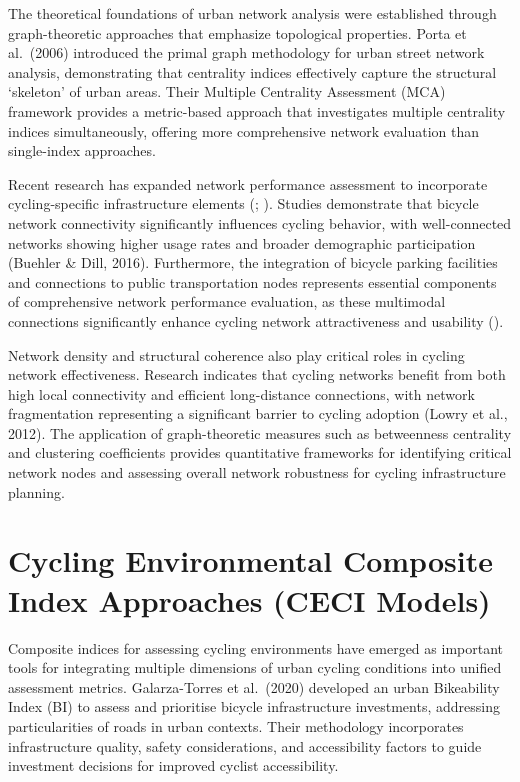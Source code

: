 \documentclass[
  12pt,
  oneside]{book}
\begin{document}
The theoretical foundations of urban network analysis were established through graph-theoretic approaches that emphasize topological properties. Porta et al.~(2006) introduced the primal graph methodology for urban street network analysis, demonstrating that centrality indices effectively capture the structural `skeleton' of urban areas. Their Multiple Centrality Assessment (MCA) framework provides a metric-based approach that investigates multiple centrality indices simultaneously, offering more comprehensive network evaluation than single-index approaches.

Recent research has expanded network performance assessment to incorporate cycling-specific infrastructure elements (\textcite{lovelace_propensity_2017}; \textcite{netjasov_potential_2019}). Studies demonstrate that bicycle network connectivity significantly influences cycling behavior, with well-connected networks showing higher usage rates and broader demographic participation (Buehler \& Dill, 2016). Furthermore, the integration of bicycle parking facilities and connections to public transportation nodes represents essential components of comprehensive network performance evaluation, as these multimodal connections significantly enhance cycling network attractiveness and usability (\textcite{geurs_multi-modal_2016}).

Network density and structural coherence also play critical roles in cycling network effectiveness. Research indicates that cycling networks benefit from both high local connectivity and efficient long-distance connections, with network fragmentation representing a significant barrier to cycling adoption (Lowry et al., 2012). The application of graph-theoretic measures such as betweenness centrality and clustering coefficients provides quantitative frameworks for identifying critical network nodes and assessing overall network robustness for cycling infrastructure planning.

\section{Cycling Environmental Composite Index Approaches (CECI Models)}\label{cycling-environmental-composite-index-approaches-ceci-models}

Composite indices for assessing cycling environments have emerged as important tools for integrating multiple dimensions of urban cycling conditions into unified assessment metrics. Galarza-Torres et al.~(2020) developed an urban Bikeability Index (BI) to assess and prioritise bicycle infrastructure investments, addressing particularities of roads in urban contexts. Their methodology incorporates infrastructure quality, safety considerations, and accessibility factors to guide investment decisions for improved cyclist accessibility.
\end{document}
